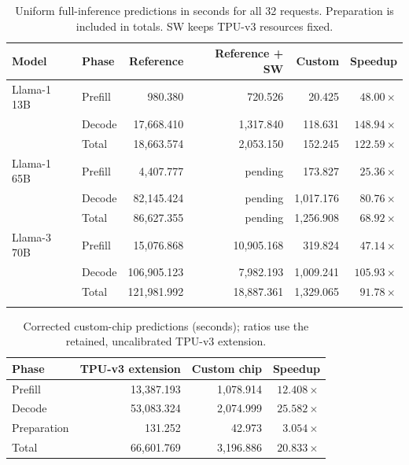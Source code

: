 \documentclass{article}
\begin{document}
\clearpage
\setcounter{table}{6}
\begin{table}[H]
\centering\scriptsize
\caption{Uniform full-inference predictions in seconds for all 32 requests. Preparation is included in totals. SW keeps TPU-v3 resources fixed.}
\label{tab:uniform_llama_phases}
\begin{tabular}{@{}llrrrr@{}}
\toprule
Model & Phase & Reference & Reference + SW & Custom & Speedup \\
\midrule
Llama-1 13B & Prefill & 980.380 & 720.526 & 20.425 & $48.00\times$ \\
 & Decode & 17,668.410 & 1,317.840 & 118.631 & $148.94\times$ \\
 & Total & 18,663.574 & 2,053.150 & 152.245 & $122.59\times$ \\
\addlinespace
Llama-1 65B & Prefill & 4,407.777 & pending & 173.827 & $25.36\times$ \\
 & Decode & 82,145.424 & pending & 1,017.176 & $80.76\times$ \\
 & Total & 86,627.355 & pending & 1,256.908 & $68.92\times$ \\
\addlinespace
Llama-3 70B & Prefill & 15,076.868 & 10,905.168 & 319.824 & $47.14\times$ \\
 & Decode & 106,905.123 & 7,982.193 & 1,009.241 & $105.93\times$ \\
 & Total & 121,981.992 & 18,887.361 & 1,329.065 & $91.78\times$ \\
\addlinespace
\bottomrule
\end{tabular}
\end{table}

\clearpage
\setcounter{table}{9}
\begin{table}[H]
\centering\small
\caption{Corrected custom-chip predictions (seconds); ratios use the retained, uncalibrated TPU-v3 extension.}
\label{tab:native_phases}
\begin{tabular}{@{}lrrr@{}}
\toprule
Phase & TPU-v3 extension & Custom chip & Speedup \\
\midrule
Prefill & 13,387.193 & 1,078.914 & $12.408\times$ \\
Decode & 53,083.324 & 2,074.999 & $25.582\times$ \\
Preparation & 131.252 & 42.973 & $3.054\times$ \\
\midrule
Total & 66,601.769 & 3,196.886 & $\mathbf{20.833\times}$ \\
\bottomrule
\end{tabular}
\end{table}
\end{document}
